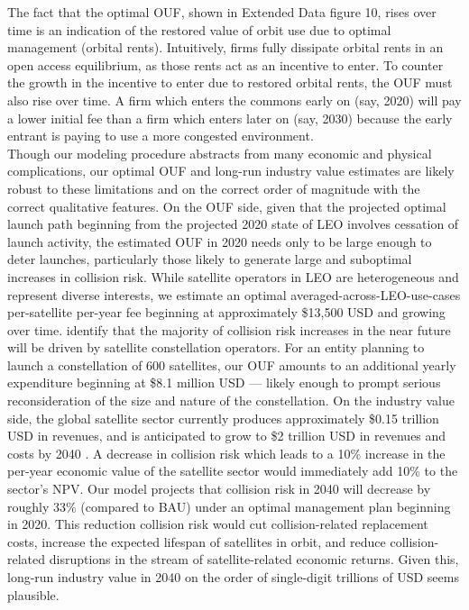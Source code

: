 \documentclass[9pt,twoside,lineno]{pnas-new}
\begin{document}
The fact that the optimal OUF, shown in Extended Data figure 10, rises over time is an indication of the restored value of orbit use due to optimal management (orbital rents). Intuitively, firms fully dissipate orbital rents in an open access equilibrium, as those rents act as an incentive to enter. To counter the growth in the incentive to enter due to restored orbital rents, the OUF must also rise over time. A firm which enters the commons early on (say, 2020) will pay a lower initial fee than a firm which enters later on (say, 2030) because the early entrant is paying to use a more congested environment. \\

Though our modeling procedure abstracts from many economic and physical complications, our optimal OUF and long-run industry value estimates are likely robust to these limitations and on the correct order of magnitude with the correct qualitative features. On the OUF side, given that the projected optimal launch path beginning from the projected 2020 state of LEO involves cessation of launch activity, the estimated OUF in 2020 needs only to be large enough to deter launches, particularly those likely to generate large and suboptimal increases in collision risk.  While satellite operators in LEO are heterogeneous and represent diverse interests, we estimate an optimal averaged-across-LEO-use-cases per-satellite per-year fee beginning at approximately \$13,500 USD and growing over time. \cite{letiziaetal2017} identify that the majority of collision risk increases in the near future will be driven by satellite constellation operators. For an entity planning to launch a constellation of 600 satellites, our OUF amounts to an additional yearly expenditure beginning at \$8.1 million USD --- likely enough to prompt serious reconsideration of the size and nature of the constellation. On the industry value side, the global satellite sector currently produces approximately \$0.15 trillion USD in revenues, and is anticipated to grow to \$2 trillion USD in revenues and costs by 2040 \citep{MSreport}. A decrease in collision risk which leads to a 10\% increase in the per-year economic value of the satellite sector would immediately add 10\% to the sector's NPV. Our model projects that collision risk in 2040 will decrease by roughly 33\% (compared to BAU) under an optimal management plan beginning in 2020. This reduction collision risk would cut collision-related replacement costs, increase the expected lifespan of satellites in orbit, and reduce collision-related disruptions in the stream of satellite-related economic returns. Given this, long-run industry value in 2040 on the order of single-digit trillions of USD seems plausible.
\end{document}
